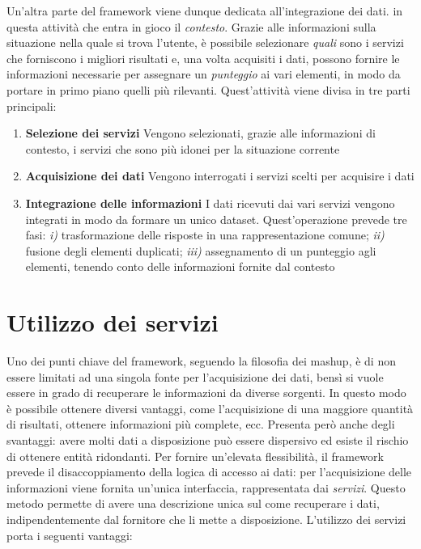 Un'altra parte del framework viene dunque dedicata all'integrazione dei dati. \upe in questa attività che entra in gioco il \emph{contesto}. Grazie alle informazioni sulla situazione nella quale si trova l'utente, è possibile selezionare \emph{quali} sono i servizi che forniscono i migliori risultati e, una volta acquisiti i dati, possono fornire le informazioni necessarie per assegnare un \emph{punteggio} ai vari elementi, in modo da portare in primo piano quelli più rilevanti. Quest'attività viene divisa in tre parti principali:

\begin{enumerate}
	\item \textbf{Selezione dei servizi} Vengono selezionati, grazie alle informazioni di contesto, i servizi che sono più idonei per la situazione corrente
	\item \textbf{Acquisizione dei dati} Vengono interrogati i servizi scelti per acquisire i dati
	\item \textbf{Integrazione delle informazioni} I dati ricevuti dai vari servizi vengono integrati in modo da formare un unico dataset. Quest'operazione prevede tre fasi: \emph{i)} trasformazione delle risposte in una rappresentazione comune; \emph{ii)} fusione degli elementi duplicati; \emph{iii)} assegnamento di un punteggio agli elementi, tenendo conto delle informazioni fornite dal contesto
\end{enumerate}

\section{Utilizzo dei servizi\label{sec:utilizzo-servizi}}

Uno dei punti chiave del framework, seguendo la filosofia dei mashup, è di non essere limitati ad una singola fonte per l'acquisizione dei dati, bensì si vuole essere in grado di recuperare le informazioni da diverse sorgenti. In questo modo è possibile ottenere diversi vantaggi, come l'acquisizione di una maggiore quantità di risultati, ottenere informazioni più complete, ecc. Presenta però anche degli svantaggi: avere molti dati a disposizione può essere dispersivo ed esiste il rischio di ottenere entità ridondanti. Per fornire un'elevata flessibilità, il framework prevede il disaccoppiamento della logica di accesso ai dati: per l'acquisizione delle informazioni viene fornita un'unica interfaccia, rappresentata dai \emph{servizi}. Questo metodo permette di avere una descrizione unica sul come recuperare i dati, indipendentemente dal fornitore che li mette a disposizione. L'utilizzo dei servizi porta i seguenti vantaggi:

